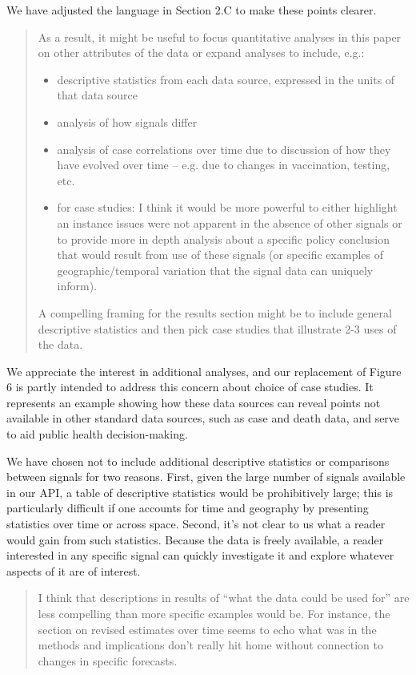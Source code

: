 \documentclass[11pt]{article}
\begin{document}
We have adjusted the language in Section 2.C to make these points clearer.

\begin{quote}
  As a result, it might be useful to focus quantitative analyses in this paper
  on other attributes of the data or expand analyses to include, e.g.:
  \begin{itemize}
  \item descriptive statistics from each data source, expressed in the units of
    that data source
  \item analysis of how signals differ
  \item analysis of case correlations over time due to discussion of how they
    have evolved over time -- e.g. due to changes in vaccination, testing, etc.
  \item for case studies: I think it would be more powerful to either highlight
    an instance issues were not apparent in the absence of other signals or to
    provide more in depth analysis about a specific policy conclusion that would
    result from use of these signals (or specific examples of
    geographic/temporal variation that the signal data can uniquely inform).
  \end{itemize}
  A compelling framing for the results section might be to include general
  descriptive statistics and then pick case studies that illustrate 2-3 uses of
  the data.
\end{quote}

We appreciate the interest in additional analyses, and our replacement of Figure
6 is partly intended to address this concern about choice of case studies. It
represents an example showing how these data sources can reveal points not
available in other standard data sources, such as case and death data, and serve
to aid public health decision-making.

We have chosen not to include additional descriptive statistics or comparisons
between signals for two reasons. First, given the large number of signals
available in our API, a table of descriptive statistics would be prohibitively
large; this is particularly difficult if one accounts for time and geography by
presenting statistics over time or across space. Second, it's not clear to us
what a reader would gain from such statistics. Because the data is freely
available, a reader interested in any specific signal can quickly investigate it
and explore whatever aspects of it are of interest.

\begin{quote}
  I think that descriptions in results of ``what the data could be used for''
  are less compelling than more specific examples would be. For instance, the
  section on revised estimates over time seems to echo what was in the methods
  and implications don't really hit home without connection to changes in
  specific forecasts.
\end{quote}
\end{document}
